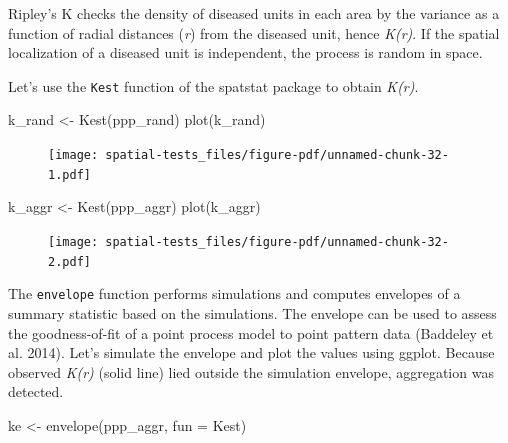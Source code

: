 \documentclass[
  letterpaper,
]{book}
\newenvironment{Shaded}{\begin{snugshade}}{\end{snugshade}}
\newcommand{\AttributeTok}[1]{\textcolor[rgb]{0.40,0.45,0.13}{#1}}
\newcommand{\FunctionTok}[1]{\textcolor[rgb]{0.28,0.35,0.67}{#1}}
\newcommand{\NormalTok}[1]{\textcolor[rgb]{0.00,0.23,0.31}{#1}}
\newcommand{\OtherTok}[1]{\textcolor[rgb]{0.00,0.23,0.31}{#1}}
\begin{document}
Ripley's K checks the density of diseased units in each area by the
variance as a function of radial distances (\emph{r}) from the diseased
unit, hence \emph{K(r)}. If the spatial localization of a diseased unit
is independent, the process is random in space.

Let's use the \texttt{Kest} function of the spatstat package to obtain
\emph{K(r)}.

\begin{Shaded}
\begin{Highlighting}[]
\NormalTok{k\_rand }\OtherTok{\textless{}{-}} \FunctionTok{Kest}\NormalTok{(ppp\_rand)}
\FunctionTok{plot}\NormalTok{(k\_rand)}
\end{Highlighting}
\end{Shaded}

\begin{figure}[H]

{\centering \texttt{[image: spatial-tests\_files/figure-pdf/unnamed-chunk-32-1.pdf]}

}

\end{figure}

\begin{Shaded}
\begin{Highlighting}[]
\NormalTok{k\_aggr }\OtherTok{\textless{}{-}} \FunctionTok{Kest}\NormalTok{(ppp\_aggr)}
\FunctionTok{plot}\NormalTok{(k\_aggr)}
\end{Highlighting}
\end{Shaded}

\begin{figure}[H]

{\centering \texttt{[image: spatial-tests\_files/figure-pdf/unnamed-chunk-32-2.pdf]}

}

\end{figure}

The \texttt{envelope} function performs simulations and computes
envelopes of a summary statistic based on the simulations. The envelope
can be used to assess the goodness-of-fit of a point process model to
point pattern data (Baddeley et al. 2014). Let's simulate the envelope
and plot the values using ggplot. Because observed \emph{K(r)} (solid
line) lied outside the simulation envelope, aggregation was detected.

\begin{Shaded}
\begin{Highlighting}[]
\NormalTok{ke }\OtherTok{\textless{}{-}} \FunctionTok{envelope}\NormalTok{(ppp\_aggr, }\AttributeTok{fun =}\NormalTok{ Kest)}
\end{Highlighting}
\end{Shaded}
\end{document}
